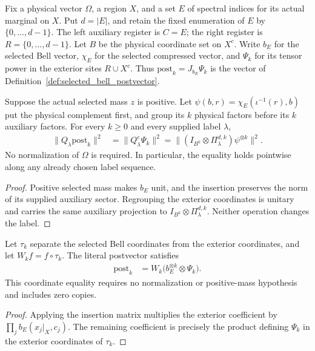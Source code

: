Fix a physical vector $\Omega$, a region $X$, and a set $E$ of spectral
indices for its actual marginal on $X$. Put $d=|E|$, and retain the fixed
enumeration of $E$ by $\{0,\ldots,d-1\}$. The left auxiliary register is
$C=E$; the right register is $R=\{0,\ldots,d-1\}$.
Let $B$ be the physical coordinate set on $X^c$.
Write $b_E$ for the selected Bell vector, $\chi_E$ for the selected
compressed vector, and $\Psi_k$ for its tensor power in the
exterior sites $R\cup X^c$. Thus $\mathrm{post}_k=J_{b_E}\Psi_k$ is the
vector of Definition~\ref{def:selected_bell_postvector}.

\begin{theorem}
    \label{thm:selected_bell_post_mass}
    \leanok
    Suppose the actual selected mass $z$ is positive. Let
    $\psi(b,r)=\chi_E(\iota^{-1}(r),b)$ put the physical complement first,
    and group its $k$ physical factors before its $k$ auxiliary factors.
    For every $k\ge0$ and every supplied label $\lambda$,
    \begin{align*}
        \|Q_\lambda\mathrm{post}_k\|^2
        &=\|Q^e_\lambda\Psi_k\|^2
          =\|(I_{B^k}\otimes\Pi^{d,k}_\lambda)\psi^{\otimes k}\|^2.
    \end{align*}
    No normalization of $\Omega$ is required. In particular, the equality
    holds pointwise along any already chosen label sequence.
\end{theorem}
\begin{proof}
    \leanok
    Positive selected mass makes $b_E$ unit, and the insertion preserves
    the norm of its supplied auxiliary sector. Regrouping the exterior
    coordinates is unitary and carries the same auxiliary projection to
    $I_{B^k}\otimes\Pi^{d,k}_\lambda$. Neither operation changes the label.
\end{proof}

\begin{theorem}
    \label{thm:selected_bell_post_pullback}
    \leanok
    Let $\tau_k$ separate the selected Bell coordinates from the
    exterior coordinates, and let $W_kf=f\circ\tau_k$.
    The literal postvector satisfies
    \begin{align*}
        \mathrm{post}_k
        &=W_k\bigl(b_E^{\otimes k}\otimes\Psi_k\bigr).
    \end{align*}
    This coordinate equality requires no normalization or positive-mass
    hypothesis and includes zero copies.
\end{theorem}
\begin{proof}
    \leanok
    Applying the insertion matrix multiplies the exterior coefficient by
    $\prod_jb_E(x_j|_X,c_j)$. The remaining coefficient is precisely the
    product defining $\Psi_k$ in the exterior coordinates of $\tau_k$.
\end{proof}

